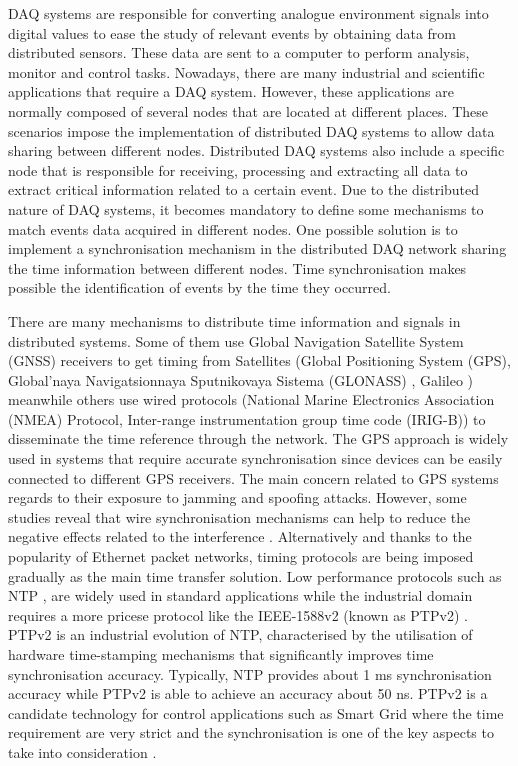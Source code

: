 DAQ \cite{daq:book1} systems are responsible for converting analogue environment signals into digital values to ease the study of relevant events by obtaining data from distributed sensors. These data are sent to a computer to perform analysis, monitor and control tasks. Nowadays, there are many industrial \cite{daq:res} and scientific applications \cite{daq:sensor-networks} that require a DAQ system. However, these applications are normally composed of several nodes that are located at different places.
These scenarios impose the implementation of distributed DAQ systems to allow data sharing between different nodes. Distributed DAQ systems also include a specific node that is responsible for receiving, processing and extracting all data to extract critical information related to a certain event. Due to the distributed nature of DAQ systems, it becomes mandatory to define some mechanisms to match events data acquired in different nodes. One possible solution is to implement a synchronisation mechanism in the distributed DAQ network sharing the time information between different nodes. Time synchronisation makes possible the identification of events by the time they occurred.

There are many mechanisms to distribute time information and signals in distributed systems. Some of them use Global Navigation Satellite System (GNSS) receivers to get timing from Satellites (Global Positioning System (GPS), Global'naya Navigatsionnaya Sputnikovaya Sistema (GLONASS)  \cite{glonass:website}, Galileo \cite{gsa:galileo}) meanwhile others use wired protocols (National Marine Electronics Association (NMEA) Protocol, Inter-range instrumentation group time code (IRIG-B)) to disseminate the time reference through the network. The GPS approach is widely used in systems that require accurate synchronisation since devices can be easily connected to different GPS receivers. The main concern related to GPS systems regards to their exposure to jamming and spoofing attacks. However, some studies reveal that wire synchronisation mechanisms can help to reduce the negative effects related to the interference \cite{NOURA2016130}. Alternatively and thanks to the popularity of Ethernet packet networks, timing protocols are being imposed gradually as the main time transfer solution. Low performance protocols such as NTP \cite{ntf:ntp_std}, are widely used in standard applications while the industrial domain requires a more pricese protocol like the IEEE-1588v2 (known as PTPv2) \cite{ieee:ieee1588_std} \cite{itu:TG8275_1_Y_1369_1}. PTPv2 is an industrial evolution of NTP, characterised by the utilisation of hardware time-stamping mechanisms that significantly improves time synchronisation accuracy. Typically, NTP provides about 1 ms synchronisation accuracy while PTPv2 is able to achieve an accuracy about 50 ns. PTPv2 is a candidate technology for control applications such as Smart Grid where the time requirement are very strict and the synchronisation is one of the key aspects to take into consideration \cite{NAFI201623} \cite{COLAK2016396}.

